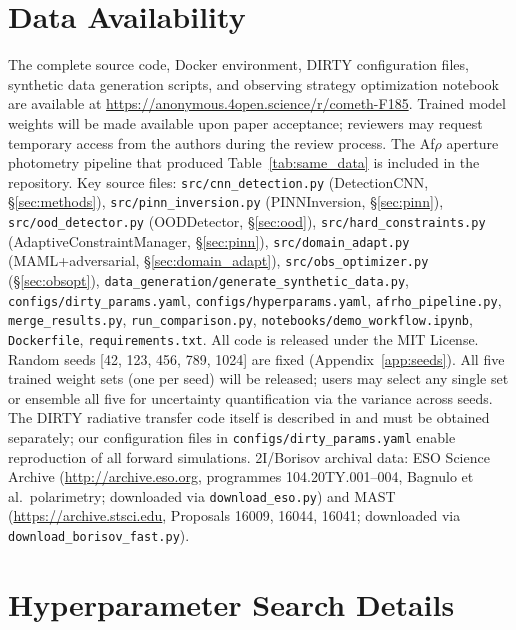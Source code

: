 \documentclass[usenatbib]{mnras}
\begin{document}
\section*{Data Availability}\label{sec:data_availability}
The complete source code, Docker environment, DIRTY configuration files, synthetic data generation scripts, and observing strategy optimization notebook are available at \url{https://anonymous.4open.science/r/cometh-F185}. Trained model weights will be made available upon paper acceptance; reviewers may request temporary access from the authors during the review process. The Af$\rho$ aperture photometry pipeline that produced Table~\ref{tab:same_data} is included in the repository. Key source files: \texttt{src/cnn\_detection.py} (DetectionCNN, \S\ref{sec:methods}), \texttt{src/pinn\_inversion.py} (PINNInversion, \S\ref{sec:pinn}), \texttt{src/ood\_detector.py} (OODDetector, \S\ref{sec:ood}), \texttt{src/hard\_constraints.py} (AdaptiveConstraintManager, \S\ref{sec:pinn}), \texttt{src/domain\_adapt.py} (MAML+adversarial, \S\ref{sec:domain_adapt}), \texttt{src/obs\_optimizer.py} (\S\ref{sec:obsopt}), \texttt{data\_generation/generate\_synthetic\_data.py}, \texttt{configs/dirty\_params.yaml}, \texttt{configs/hyperparams.yaml}, \texttt{afrho\_pipeline.py}, \texttt{merge\_results.py}, \texttt{run\_comparison.py}, \texttt{notebooks/demo\_workflow.ipynb}, \texttt{Dockerfile}, \texttt{requirements.txt}. All code is released under the MIT License. Random seeds [42, 123, 456, 789, 1024] are fixed (Appendix~\ref{app:seeds}). All five trained weight sets (one per seed) will be released; users may select any single set or ensemble all five for uncertainty quantification via the variance across seeds. The DIRTY radiative transfer code itself is described in \citet{gordon01} and must be obtained separately; our configuration files in {\tt configs/dirty\_params.yaml} enable reproduction of all forward simulations. 2I/Borisov archival data: ESO Science Archive (\url{http://archive.eso.org}, programmes 104.20TY.001--004, Bagnulo et al.\ polarimetry; downloaded via \texttt{download\_eso.py}) and MAST (\url{https://archive.stsci.edu}, Proposals 16009, 16044, 16041; downloaded via \texttt{download\_borisov\_fast.py}).




\appendix

\section{Hyperparameter Search Details}\label{app:hyper_search}
\end{document}

